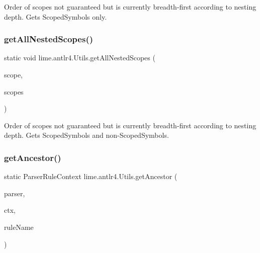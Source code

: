 Order of scopes not guaranteed but is currently breadth-\/first according to nesting depth. Gets Scoped\+Symbols only. \mbox{\label{classlime_1_1antlr4_1_1Utils_a1ed5adf856e7f1ca2abaccab52b27238}} 
\subsubsection{\texorpdfstring{get\+All\+Nested\+Scopes()}{getAllNestedScopes()}}
{\footnotesize\ttfamily static void lime.\+antlr4.\+Utils.\+get\+All\+Nested\+Scopes (\begin{DoxyParamCaption}\item[{\hyperlink{interfacelime_1_1antlr4_1_1Scope}{Scope}}]{scope,  }\item[{List$<$ \hyperlink{interfacelime_1_1antlr4_1_1Scope}{Scope} $>$}]{scopes }\end{DoxyParamCaption})\hspace{0.3cm}{\ttfamily [static]}}

Order of scopes not guaranteed but is currently breadth-\/first according to nesting depth. Gets Scoped\+Symbols and non-\/\+Scoped\+Symbols. \mbox{\label{classlime_1_1antlr4_1_1Utils_a9eedc911b30d825b87b688cd7a2c4d66}} 
\subsubsection{\texorpdfstring{get\+Ancestor()}{getAncestor()}\hspace{0.1cm}{\footnotesize\ttfamily [1/2]}}
{\footnotesize\ttfamily static Parser\+Rule\+Context lime.\+antlr4.\+Utils.\+get\+Ancestor (\begin{DoxyParamCaption}\item[{Parser}]{parser,  }\item[{Parser\+Rule\+Context}]{ctx,  }\item[{String}]{rule\+Name }\end{DoxyParamCaption})\hspace{0.3cm}{\ttfamily [static]}}

